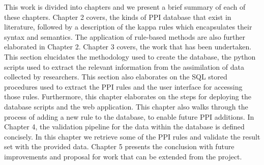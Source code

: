 \documentclass[msc,deptreport,ai]{infthesis}      %
\begin{document}
This work is divided into chapters and we present a brief summary of each of these chapters. Chapter 2 covers, the kinds of PPI database that exist in literature, followed by a description of the kappa rules which encapsulates their syntax and semantics. The application of rule-based methods are also further elaborated in Chapter 2. Chapter 3 covers, the work that has been undertaken. This section elucidates the methodology used to create the database, the python scripts used to extract the relevant information from the assimilation of data collected by researchers. This section also elaborates on the SQL stored procedures used to extract the PPI rules and the user interface for accessing those rules. Furthermore, this chapter elaborates on the steps for deploying the database scripts and the web application. This chapter also walks through the process of adding a new rule to the database, to enable future PPI additions. In Chapter 4, the validation pipeline for the data within the database is defined concisely. In this chapter we retrieve some of the PPI rules and validate the result set with the provided data. Chapter 5 presents the conclusion with future improvements and proposal for work that can be extended from the project.


\end{document}
